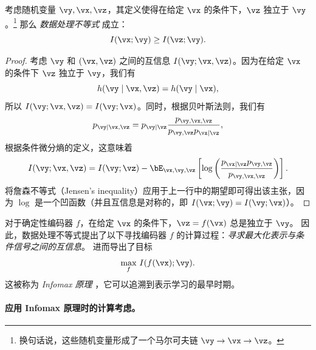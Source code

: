 \documentclass[../../book-main_zh.tex]{subfiles}
\begin{document}
\begin{theorem}[数据处理不等式]\label{thm:dpi}
    考虑随机变量 $\vy, \vx, \vz$，其定义使得在给定 $\vx$ 的条件下，$\vz$ 独立于 $\vy$。\footnote{换句话说，这些随机变量形成了一个马尔可夫链 $\vy \to \vx \to \vz$。} 那么 \textit{数据处理不等式} 成立：
    \begin{equation}\label{eq:dpi-ch7}
        I(\vx; \vy) \geq I(\vz; \vy).
    \end{equation}
    \begin{proof}
        考虑 $\vy$ 和 $(\vx, \vz)$ 之间的互信息 $I(\vy; \vx, \vz)$。因为在给定 $\vx$ 的条件下 $\vz$ 独立于 $\vy$，我们有
        \begin{equation*}
            h(\vy \mid \vx, \vz) = h(\vy \mid \vx),
        \end{equation*}
        所以 $I(\vy; \vx, \vz) = I(\vy; \vx)$。同时，根据贝叶斯法则，我们有
        \begin{equation*}
            p_{\vy \mid \vx, \vz} = p_{\vy \mid \vz}
            \frac{p_{\vy, \vx, \vz}}{p_{\vy, \vz} p_{\vx \mid \vz}},
        \end{equation*}
        根据条件微分熵的定义，这意味着
        \begin{equation*}
            I(\vy; \vx, \vz) = 
            I(\vy; \vz)
            - \bE_{\vx, \vy, \vz}\left[ \log \left( 
                \frac{p_{\vx \mid \vz} p_{\vy, \vz}}{p_{\vy, \vx, \vz}} 
            \right)\right].
        \end{equation*}
        将詹森不等式（Jensen's inequality）应用于上一行中的期望即可得出该主张，因为 $\log$ 是一个凹函数（并且互信息是对称的，即 $I(\vx; \vy) = I(\vy; \vx)$）。
    \end{proof}
\end{theorem}

对于确定性编码器 $f$，在给定 $\vx$ 的条件下，$\vz = f(\vx)$ 总是独立于 $\vy$。
因此，数据处理不等式提出了以下寻找编码器 $f$ 的计算过程：\textit{寻求最大化表示与条件信号之间的互信息}。
 进而导出了目标
\begin{equation}\label{eq:infomax-x}
    \max_{f}\, I(f(\vx); \vy).
\end{equation}
这被称为 \textit{Infomax 原理} \cite{infomax}，它可以追溯到表示学习的最早时期。

\paragraph{应用 Infomax 原理时的计算考虑。}
\end{document}
